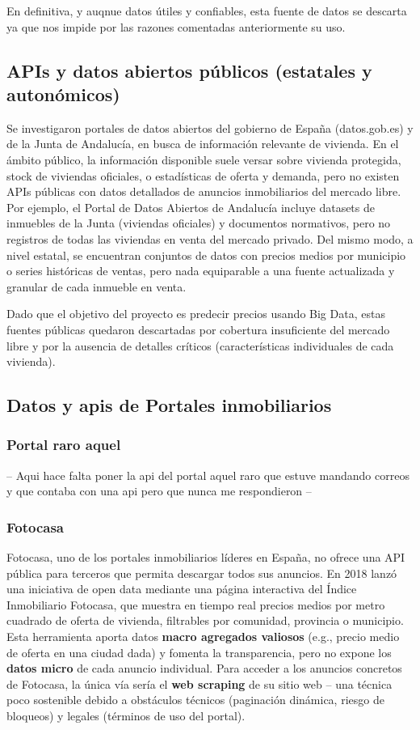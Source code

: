 \documentclass[a4paper,11pt]{book}
\begin{document}
En definitiva, y auqnue datos útiles y confiables, esta fuente de datos se descarta ya que nos impide por las razones comentadas anteriormente su uso.

\subsection{APIs y datos abiertos públicos (estatales y autonómicos)}
Se investigaron portales de datos abiertos del gobierno de España (datos.gob.es) y de la Junta de Andalucía, en busca de información relevante de vivienda. En el ámbito público, la información disponible suele versar sobre vivienda protegida, stock de viviendas oficiales, o estadísticas de oferta y demanda, pero no existen APIs públicas con datos detallados de anuncios inmobiliarios del mercado libre. Por ejemplo, el Portal de Datos Abiertos de Andalucía incluye datasets de inmuebles de la Junta (viviendas oficiales) y documentos normativos, pero no registros de todas las viviendas en venta del mercado privado. Del mismo modo, a nivel estatal, se encuentran conjuntos de datos con precios medios por municipio o series históricas de ventas, pero nada equiparable a una fuente actualizada y granular de cada inmueble en venta.

Dado que el objetivo del proyecto es predecir precios usando Big Data, estas fuentes públicas quedaron descartadas por cobertura insuficiente del mercado libre y por la ausencia de detalles críticos (características individuales de cada vivienda).

\subsection{Datos y apis de Portales inmobiliarios} 
\subsubsection{Portal raro aquel}
--
Aqui hace falta poner la api del portal aquel raro que estuve mandando correos y que contaba con una api
pero que nunca me respondieron
--
\subsubsection{Fotocasa}
Fotocasa, uno de los portales inmobiliarios líderes en España, no ofrece una API pública para terceros que permita descargar todos sus anuncios. En 2018 lanzó una iniciativa de open data mediante una página interactiva del Índice Inmobiliario Fotocasa, que muestra en tiempo real precios medios por metro cuadrado de oferta de vivienda, filtrables por comunidad, provincia o municipio. Esta herramienta aporta datos \textbf{macro agregados valiosos} (e.g., precio medio de oferta en una ciudad dada) y fomenta la transparencia, pero no expone los \textbf{datos micro} de cada anuncio individual. Para acceder a los anuncios concretos de Fotocasa, la única vía sería el \textbf{web scraping} de su sitio web – una técnica poco sostenible debido a obstáculos técnicos (paginación dinámica, riesgo de bloqueos) y legales (términos de uso del portal). 
\end{document}
